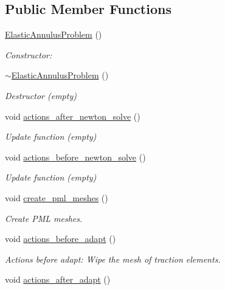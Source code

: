 \subsection*{Public Member Functions}
\begin{DoxyCompactItemize}
\item 
\hyperlink{classElasticAnnulusProblem_aedf3d30576ccc20e2d8aa809cf075228}{Elastic\+Annulus\+Problem} ()
\begin{DoxyCompactList}\small\item\em Constructor\+: \end{DoxyCompactList}\item 
\hyperlink{classElasticAnnulusProblem_a7e791acd99dc0ae25ab9f2e2fd07c587}{$\sim$\+Elastic\+Annulus\+Problem} ()
\begin{DoxyCompactList}\small\item\em Destructor (empty) \end{DoxyCompactList}\item 
void \hyperlink{classElasticAnnulusProblem_adfb87876ac9981899c6c0b4caf0786f9}{actions\+\_\+after\+\_\+newton\+\_\+solve} ()
\begin{DoxyCompactList}\small\item\em Update function (empty) \end{DoxyCompactList}\item 
void \hyperlink{classElasticAnnulusProblem_af50a0dc2601e1a5e884166941d2cb9ce}{actions\+\_\+before\+\_\+newton\+\_\+solve} ()
\begin{DoxyCompactList}\small\item\em Update function (empty) \end{DoxyCompactList}\item 
void \hyperlink{classElasticAnnulusProblem_a0d2b0cc613caaca7c8f1a78c80b40bc7}{create\+\_\+pml\+\_\+meshes} ()
\begin{DoxyCompactList}\small\item\em Create P\+ML meshes. \end{DoxyCompactList}\item 
void \hyperlink{classElasticAnnulusProblem_abc8f38dd49a37b06212c168588301900}{actions\+\_\+before\+\_\+adapt} ()
\begin{DoxyCompactList}\small\item\em Actions before adapt\+: Wipe the mesh of traction elements. \end{DoxyCompactList}\item 
void \hyperlink{classElasticAnnulusProblem_aa47beeedeac662b19c0f992daf77ef25}{actions\+\_\+after\+\_\+adapt} ()

\end{DoxyCompactItemize}
